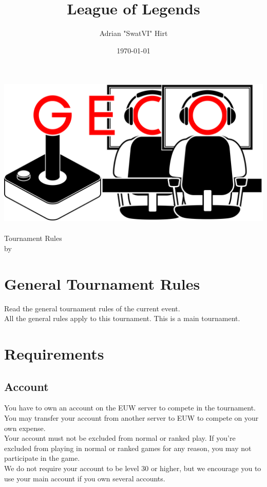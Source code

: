 \documentclass{article}
\title{League of Legends}
\author{Adrian "SwatVI" Hirt}
\date{\today}
\begin{document}
\makeatletter
\begin{titlepage}
\centering
\includegraphics[scale=0.075]{../img/GECo.png}\\
\LARGE \@title\\ Tournament Rules\\ \normalsize by \@author\\ \@date
\end{titlepage}
\makeatother


\clearpage

\tableofcontents
\clearpage

\section{General Tournament Rules}
Read the general tournament rules of the current event.\\
All the general rules apply to this tournament. This is a main tournament.

\section{Requirements}
\subsection{Account}
You have to own an account on the EUW server to compete in the tournament. You may transfer your account from another server to EUW to compete on your own expense.
\\
Your account must not be excluded from normal or ranked play. If you're excluded from playing in normal or ranked games for any reason, you may not participate in the game.
\\
We do not require your account to be level 30 or higher, but we encourage you to use your main account if you own several accounts.
\end{document}
